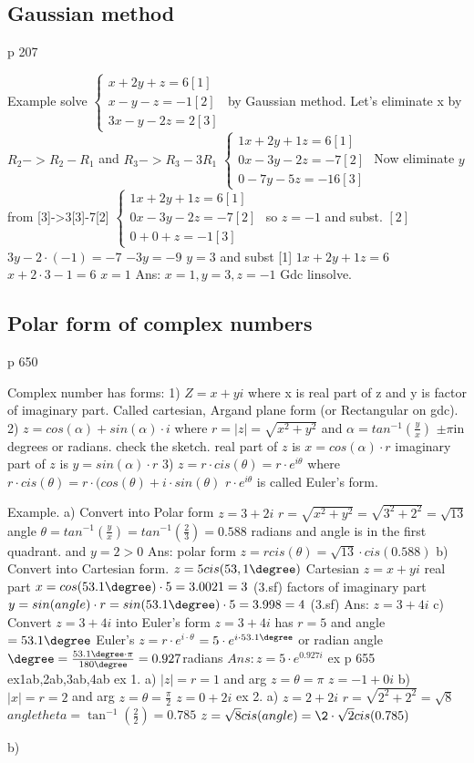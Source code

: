 \subsection{Gaussian method}
p 207

Example solve $\begin{cases}
x+2y+z=6[1] \\ 
x-y-z=-1[2] \\
3x-y-2z=2[3]
\end{cases}$ by Gaussian method.
Let's eliminate x by $R_2->R_2-R_1$ and $R_3->R_3-3R_1$
$\begin{cases}
1x+2y+1z=6[1] \\ 
0x-3y-2z=-7[2] \\
0-7y-5z=-16[3]
\end{cases}$
Now eliminate $y$ from [3]->3[3]-7[2]
$\begin{cases}
1x+2y+1z=6[1] \\ 
0x-3y-2z=-7[2] \\
0+0+z=-1[3]
\end{cases}$
so $z=-1$ and subst. $[2]$ $3y-2\cdot(-1)=-7$
$-3y=-9$
$y=3$
and subst [1] $1x+2y+1z=6$
$x+2\cdot 3-1=6$
$x=1$
Ans: $x=1,y=3,z=-1$
Gdc linsolve.

\subsection{Polar form of complex numbers}
p 650

Complex number has forms:
1) $Z=x+yi$ where x is real part of z and y is factor of imaginary part.
Called cartesian, Argand plane form (or Rectangular on gdc).
2) $z=cos(\alpha)+sin(\alpha)\cdot i$
where $r=|z|=\sqrt{x^2+y^2}$
and $\alpha=tan^{-1}(\frac{y}{x})$ $\pm\pi$in degrees or radians.
check the sketch.
real part of $z$ is $x=cos(\alpha)\cdot r$
imaginary part of $z$ is $y=sin(\alpha)\cdot r$
3) $z=r\cdot cis(\theta)=r\cdot e^{i\theta}$
where $r\cdot cis(\theta)=r\cdot (cos(\theta)+i\cdot sin(\theta)$
$r\cdot e^{i\theta}$ is called Euler's form.

Example. a) Convert into Polar form 
$z=3+2i$
$r=\sqrt{x^2+y^2}=\sqrt{3^2+2^2}=\sqrt{13}$
angle $\theta=tan^{-1}(\frac{y}{x})=tan^{-1}(\frac{2}{3})=0.588$ radians
and angle is in the first quadrant.
and $y=2>0$
Ans: polar form $z=rcis(\theta)=\sqrt{13}\cdot cis(0.588)$
b) Convert into Cartesian form.
$z=5cis(53,1\degree)$
Cartesian $z=x+yi$
real part $x=cos(53.1\degree)\cdot 5=3.0021=3$ (3.sf)
factors of imaginary part $y=sin(angle)\cdot r=sin(53.1\degree)\cdot 5=3.998=4$ (3.sf)
Ans: $z=3+4i$
c) Convert $z=3+4i$ into Euler's form
$z=3+4i$ has $r=5$ and angle $=53.1\degree$
Euler's $z=r\cdot e^{i\cdot\theta}$
$=5\cdot e^{i\cdot 53.1\degree}$
or radian angle $\degree=\frac{53.1\degree\cdot \pi}{180\degree}=0.927$radians
$Ans: z=5\cdot e^{0.927i}$
ex p 655 ex1ab,2ab,3ab,4ab
ex 1. 
a) $|z|=r=1$ and arg $z=\theta=\pi$
$z=-1+0i$
b) $|x|=r=2$ and arg $z=\theta=\frac{\pi}{2}$
$z=0+2i$
ex 2.
a) $z=2+2i$
$r=\sqrt{2^2+2^2}=\sqrt{8}$
$angle theta=\tan^{-1}(\frac{2}{2})=0.785$
$z=\sqrt{8} cis(angle)=\2\cdot\sqrt{2}cis(0.785)$

b) 
